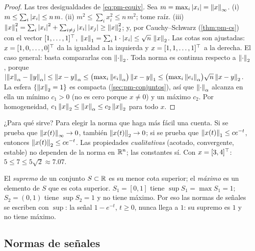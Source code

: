 \begin{proof}
Las tres desigualdades de \eqref{eq:pm-equiv}. Sea $m=\max_i\left\lvert x_i\right\rvert=\left\lVert x\right\rVert_\infty$. (i) $m\le\sum_i\left\lvert x_i\right\rvert\le n\,m$. (ii) $m^2\le\sum_ix_i^2\le n\,m^2$; tome raíz. (iii) $\left\lVert x\right\rVert_1^2=\sum_i\left\lvert x_i\right\rvert^2+\sum_{i\ne j}\left\lvert x_i\right\rvert\left\lvert x_j\right\rvert\ge\left\lVert x\right\rVert_2^2$; y, por Cauchy--Schwarz (\cref{thm:pm-cs}) con el vector $[1,\dots,1]^{\top}$, $\left\lVert x\right\rVert_1=\sum_i1\cdot\left\lvert x_i\right\rvert\le\sqrt n\,\left\lVert x\right\rVert_2$. Las cotas son ajustadas: $x=[1,0,\dots,0]^{\top}$ da la igualdad a la izquierda y $x=[1,1,\dots,1]^{\top}$ a la derecha.
El caso general: basta compararlas con $\left\lVert \cdot\right\rVert_2$. Toda norma es continua respecto a $\left\lVert \cdot\right\rVert_2$, porque $\left\lvert \left\lVert x\right\rVert_\alpha-\left\lVert y\right\rVert_\alpha\right\rvert\le\left\lVert x-y\right\rVert_\alpha\le\bigl(\max_i\left\lVert e_i\right\rVert_\alpha\bigr)\left\lVert x-y\right\rVert_1\le\bigl(\max_i\left\lVert e_i\right\rVert_\alpha\bigr)\sqrt n\left\lVert x-y\right\rVert_2$. La esfera $\{\left\lVert x\right\rVert_2=1\}$ es compacta (\cref{sec:pm-conjuntos}), así que $\left\lVert \cdot\right\rVert_\alpha$ alcanza en ella un mínimo $c_1>0$ (no es cero porque $x\neq0$) y un máximo $c_2$. Por homogeneidad, $c_1\left\lVert x\right\rVert_2\le\left\lVert x\right\rVert_\alpha\le c_2\left\lVert x\right\rVert_2$ para todo $x$.
\end{proof}

¿Para qué sirve? Para elegir la norma que haga más fácil una cuenta. Si se prueba que $\left\lVert x(t)\right\rVert_\infty\to0$, también $\left\lVert x(t)\right\rVert_2\to0$; si se prueba que $\left\lVert x(t)\right\rVert_1\le ce^{-t}$, entonces $\left\lVert x(t)\right\rVert_2\le ce^{-t}$. Las propiedades \emph{cualitativas} (acotado, convergente, estable) no dependen de la norma en $\mathbb{R}^n$; las constantes sí. Con $x=[3,4]^{\top}$: $5\le7\le5\sqrt2\approx7.07$.

\begin{cuidado}
El \emph{supremo} de un conjunto $S\subset\mathbb{R}$ es su menor cota superior; el \emph{máximo} es un elemento de $S$ que es cota superior. $S_1=[0,1]$ tiene $\sup S_1=\max S_1=1$; $S_2=(0,1)$ tiene $\sup S_2=1$ y no tiene máximo. Por eso las normas de señales se escriben con $\sup$: la señal $1-e^{-t}$, $t\ge0$, nunca llega a $1$: su supremo es $1$ y no tiene máximo.
\end{cuidado}

\subsection{Normas de señales}

